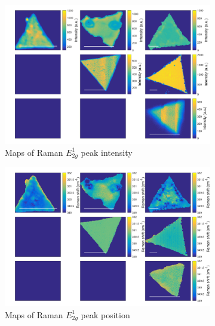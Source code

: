 \begin{figure}[h]
	\begin{center}
		\begin{subfigure}[b]{0.4\textwidth}
			\includegraphics[width=\textwidth]{PaperSIMapsIntensityE.png}
			\caption{Maps of Raman $E^1_{2g}$ peak intensity}
			\label{fig:PaperSIMapsIntensityE}
		\end{subfigure}
		\quad
		\begin{subfigure}[b]{0.4\textwidth}
			\includegraphics[width=\textwidth]{PaperSIMapsPositionE.png}
			\caption{Maps of Raman $E^1_{2g}$ peak position}
			\label{fig:PaperSIMapsPositionE}
		\end{subfigure}
		\hfill
		\begin{subfigure}[b]{0.4\textwidth}

\end{subfigure}
\end{center}
\end{figure}
